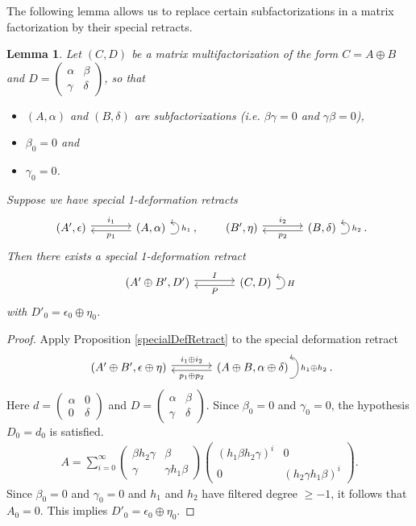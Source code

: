 \documentclass{article}
\newcommand{\sdr}[5]{%
  \begin{tikzcd}[column sep=large, ampersand replacement=\&]
    {#1} \arrow[r, "#3", shift left=0.5ex,] \arrow[r, leftarrow, "#4", shift right=0.5ex, swap] \& 
    {#2} \arrow[loop right, distance=1em, in=15, out=-15, "#5",swap]
  \end{tikzcd}%
}
\theoremstyle{plain} %
\newtheorem{lemma}[theorem]{Lemma}
\theoremstyle{definition} %
\theoremstyle{remark} %
\begin{document}
The following lemma allows us to replace certain subfactorizations in a matrix factorization by their special retracts.

\begin{lemma}\label{SummandLemma}
	Let $(C,D)$ be a matrix multifactorization of the form $C=A\oplus B$ and 
	$D=\begin{pmatrix}\alpha & \beta \\ \gamma & \delta \end{pmatrix}$, so that \begin{itemize}
		\item $(A,\alpha)$ and $(B,\delta)$ are subfactorizations (i.e. $\beta\gamma=0$ and $\gamma\beta=0$), 
		\item $\beta_0=0$  and
		\item $\gamma_0=0$.
	\end{itemize}
Suppose we have special 1-deformation retracts 
$$
\sdr{(A',\epsilon)}{(A,\alpha)}{i_1}{p_1}{h_1}
,\qquad
\sdr{(B',\eta)}{(B,\delta)}{i_2}{p_2}{h_2}
.
$$ 
Then there exists a special 1-deformation retract
	$$
	\sdr{(A'\oplus B',D')}{(C,D)}{I}{P}{H}
	$$
	with $D'_0=\epsilon_0\oplus \eta_0$.
	
	
\end{lemma}

\begin{proof}
	Apply Proposition \ref{specialDefRetract} to the special deformation retract 
	$$\sdr{(A'\oplus B',\epsilon\oplus \eta)}{(A\oplus B,\alpha\oplus \delta)}{i_1\oplus i_2}{p_1\oplus p_2}{h_1\oplus h_2}.$$
	Here $d=\begin{pmatrix}\alpha & 0\\ 0 & \delta \end{pmatrix}$ and $D=\begin{pmatrix}\alpha & \beta \\ \gamma & \delta \end{pmatrix}$. Since $\beta_0=0$ and $\gamma_0=0$, the hypothesis $D_0=d_0$ is satisfied. 
	\begin{align}\label{eq:matrixAsum}
		A= \sum_{i=0}^\infty\begin{pmatrix}
			\beta h_2\gamma& \beta \\ \gamma & \gamma h_1 \beta
		\end{pmatrix}\begin{pmatrix}
			(h_1\beta h_2\gamma)^i & 0\\ 0& (h_2\gamma h_1\beta )^i
		\end{pmatrix}.
	\end{align}
	Since $\beta_0=0$ and $\gamma_0=0$ and $h_1$ and $h_2$ have filtered degree $\geq-1$, it follows that $A_0=0$. This implies $D'_0=\epsilon_0\oplus \eta_0$.
\end{proof}
	
\end{document}
